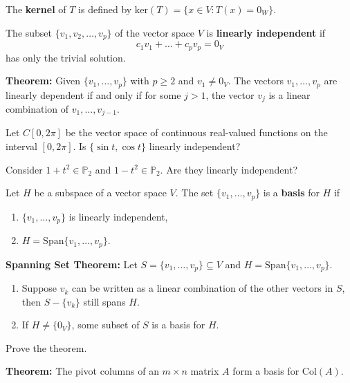 \documentclass[12pt,letterpaper]{article}
\begin{document}
\begin{itemize}
The {\bf kernel} of $T$ is defined by $\text{ker}(T)=\{ x \in V: T(x)=0_W\}.$
\end{itemize}

\newpage

\begin{defn}
	The subset $\{ v_1, v_2, \dots, v_p\}$ of the vector space $V$ is {\bf linearly independent} if $$c_1 v_1+\dots+ c_p v_p =0_V$$ has only the trivial solution.
\end{defn}

{\bf Theorem:} Given $\{ v_1, \dots, v_p\}$ with $p\geq 2$ and $v_1\neq 0_V$. The vectors $v_1, \dots, v_p$ are linearly dependent if and only if for some $j>1$, the vector $v_j$ is a linear combination of $v_1, \dots, v_{j-1}$.

\begin{enumerate}


\Problem 
\Part Let $C[0,2\pi]$ be the vector space of continuous real-valued functions on the interval $[0,2\pi]$. Is $\{ \sin{t}, \cos{t} \}$ linearly independent?

\vfill

\Part Consider $1+t^2 \in \mathbb{P}_2$ and $1-t^2 \in \mathbb{P}_2$. Are they linearly independent?

\vfill

\newpage

\begin{defn} Let $H$ be a subspace of a vector space $V$. The set $\{v_1, \dots, v_p\}$ is a {\bf basis} for $H$ if
	\begin{enumerate}
		\item  $\{v_1, \dots, v_p\}$ is linearly independent,
		\item $H=\text{Span}\{v_1, \dots, v_p \}$.
	\end{enumerate}
\end{defn}

{\bf Spanning Set Theorem:} Let $S=\{ v_1,\dots,v_p\} \subseteq V$ and $H=\text{Span}\{v_1,\dots, v_p \}$.
\begin{enumerate}
	\item Suppose $v_k$ can be written as a linear combination of the other vectors in $S$, then $S-\{v_k\}$ still spans $H$.
	\item If $H\neq \{ 0_V\}$, some subset of $S$ is a basis for $H$.
\end{enumerate} 

\Problem Prove the theorem.

\newpage

{\bf Theorem:} The pivot columns of an $m \times n$ matrix $A$ form a basis for $\text{Col}(A)$.


\end{enumerate}
\end{document}
